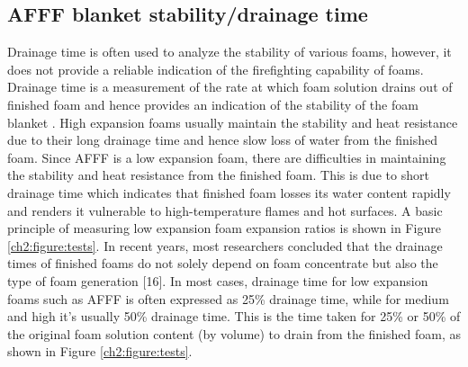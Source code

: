 \documentclass[12pt]{report}
\begin{document}
\subsection{AFFF blanket stability/drainage time}
Drainage time is often used to analyze the stability of various foams, however, it does not provide a reliable indication of the firefighting capability of foams. Drainage time is a measurement of the rate at which foam solution drains out of finished foam and hence provides an indication of the stability of the foam blanket \cite{aamodt2020review}. High expansion foams usually maintain the stability and heat resistance due to their long drainage time and hence slow loss of water from the finished foam. 
Since AFFF is a low expansion foam, there are difficulties in maintaining the stability and heat resistance from the finished foam. This is due to short drainage time which indicates that finished foam losses its water content rapidly and renders it vulnerable to high-temperature flames and hot surfaces. A basic principle of measuring low expansion foam expansion ratios is shown in Figure \ref{ch2:figure:tests}. In recent years, most researchers concluded that the drainage times of finished foams do not solely depend on foam concentrate but also the type of foam generation [16]. In most cases, drainage time for low expansion foams such as AFFF is often expressed as 25\% drainage time, while for medium and high it’s usually 50\% drainage time. This is the time taken for 25\% or 50\% of the original foam solution content (by volume) to drain from the finished foam, as shown in Figure \ref{ch2:figure:tests}.
\end{document}
